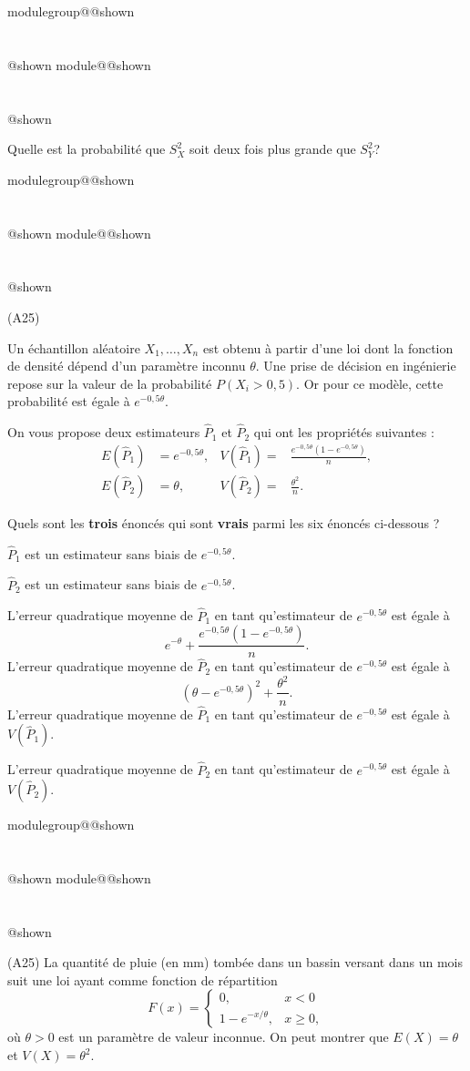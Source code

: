 \documentclass{Evaluation}
\makeatletter
\newcommand{\currentmodulekey}{}
\newcommand{\currentmoduletitle}{}
\newcommand{\currentgroupkey}{}
\newcommand{\currentgrouptitle}{}
\newcommand{\showmoduleifneeded}{%
  \ifx\currentgroupkey\empty\else
    \expandafter\ifx\csname modulegroup@\currentgroupkey @shown\endcsname\relax
      \section*{\currentgrouptitle}%
      \expandafter\gdef\csname modulegroup@\currentgroupkey @shown\endcsname{1}%
    \fi
  \fi
  \expandafter\ifx\csname module@\currentmodulekey @shown\endcsname\relax
    \section*{\currentmoduletitle}%
    \expandafter\gdef\csname module@\currentmodulekey @shown\endcsname{1}%
  \fi
}
\newenvironment{A24}{\showmoduleifneeded}{}
\newenvironment{A25}{\showmoduleifneeded}{}
\makeatother
\begin{document}
\begin{questions}
\begin{A24}
Quelle est la probabilité que $S_X^2$ soit deux fois plus grande que $S_Y^2$?
\end{A24}

\begin{A25}
\question (A25)

Un échantillon aléatoire $X_1,\dots,X_n$ est obtenu à partir d'une loi dont la fonction
de densité dépend d'un paramètre inconnu $\theta$. Une prise de décision en ingénierie
repose sur la valeur de la probabilité $P(X_i>0,5)$. Or pour ce modèle, 
cette probabilité est égale à $e^{-0,5\theta}$.

On vous propose deux estimateurs $\hat{P}_1$ et $\hat{P}_2$ qui ont les propriétés suivantes :
\begin{align*}
    E(\hat{P}_1)&= e^{-0,5\theta},&  V(\hat{P}_1) =& \frac{e^{-0,5\theta}\left(1-e^{-0,5\theta}\right)}{n}, \\
    E(\hat{P}_2) &= \theta,&  V(\hat{P}_2) =&\frac{\theta^2}{n} .
\end{align*}

Quels sont les \textbf{trois} énoncés qui sont \textbf{vrais} parmi les six énoncés ci-dessous ?

\begin{checkboxes}
    \correctchoice $\hat{P}_1$ est un estimateur sans biais de $e^{-0,5\theta}$.
 
\choice $\hat{P}_2$ est un estimateur sans biais de $e^{-0,5\theta}$.

\choice L'erreur quadratique moyenne de $\hat{P}_1$ en tant qu'estimateur de $e^{-0,5\theta}$ est égale à 
$$e^{-\theta}+\frac{e^{-0,5\theta}\left(1-e^{-0,5\theta}\right)}{n}.$$
    \correctchoice L'erreur quadratique moyenne de $\hat{P}_2$ en tant qu'estimateur de $e^{-0,5\theta}$
est égale à 
$$\left(\theta-e^{-0,5\theta}\right)^2+\frac{\theta^2}{n}.$$
\correctchoice L'erreur quadratique moyenne de $\hat{P}_1$ en tant qu'estimateur de $e^{-0,5\theta}$ est égale à 
$V(\hat{P}_1)$.

\choice L'erreur quadratique moyenne de $\hat{P}_2$ en tant qu'estimateur de $e^{-0,5\theta}$ est égale à 
$V(\hat{P}_2)$.
\end{checkboxes}
\end{A25}

\begin{A25}
\question (A25) La quantité de pluie (en mm) tombée dans un bassin versant
dans un mois suit une loi ayant comme fonction de répartition
$$F(x)=\left\{\begin{array}{ll}
0, & x<0\\
1-e^{-x/\theta}, & x\ge 0,
\end{array}\right.$$
où $\theta>0$ est un paramètre de valeur inconnue. On peut montrer que $E(X)=\theta$ et $V(X)=\theta^2$.


\end{A25}
\end{questions}
\end{document}
